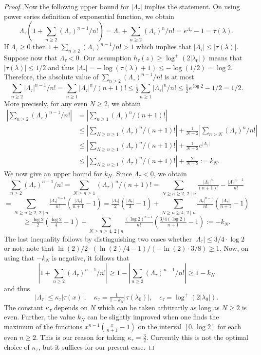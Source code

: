 \begin{proof}
Now the following upper bound for $|\Lambda_\tau|$ implies the statement. On using power series definition of exponential function, we obtain $$\Lambda_\tau(1+\sum_{n\geq 2} (\Lambda_\tau)^{n-1}/n!)=\Lambda_\tau+\sum_{n\geq 2} (\Lambda_\tau)^n/n!=e^{\Lambda_\tau}-1=\tau(\lambda).$$
If $\Lambda_\tau\geq 0$ then $1+\sum_{n\geq 2} (\Lambda_\tau)^{n-1}/n!>1$ which implies that $|\Lambda_\tau|\leq |\tau(\lambda)|.$ Suppose now that $\Lambda_\tau<0$. Our assumption $h_{\tau}(z)\geq \log^+ (2|\lambda_0|)$ means that $|\tau(\lambda)|\leq 1/2$ and thus $|\Lambda_\tau|=-\log (\tau(\lambda)+1)\leq -\log(1/2)=\log 2.$ Therefore, the absolute value of $\sum_{n\geq 2} (\Lambda_\tau)^{n-1}/n!$ is at most $$\sum_{n\geq 2} |\Lambda_\tau|^{n-1}/n!=\sum_{n\geq 1} |\Lambda_\tau|^{n}/(n+1)!\leq \tfrac{1}{2}\sum_{n\geq 1} |\Lambda_\tau|^{n}/n!\leq
\tfrac{1}{2}e^{\log 2}-1/2=1/2.$$
More precisely, for any even $N\geq 2$, we obtain 
\begin{align*}
|\sum_{n\geq 2} (\Lambda_\tau)^{n-1}/n!|
	& =|\sum_{n\geq 1} (\Lambda_\tau)^{n}/(n+1)!|\\
	&\leq |\sum_{N\geq n\geq 1} (\Lambda_\tau)^{n}/(n+1)!|+\tfrac{1}{N+2}|\sum_{n>N} (\Lambda_\tau)^{n}/n!|\\
	&\leq |\sum_{N\geq n\geq 1} (\Lambda_\tau)^{n}/(n+1)!|+\tfrac{1}{N+2}e^{|\Lambda_\tau|}\\
	& \leq |\sum_{N\geq n\geq 1} (\Lambda_\tau)^{n}/(n+1)!|+\tfrac{2}{N+2}:=k_N.
\end{align*}
We now give an upper bound for $k_N$. Since $\Lambda_\tau<0$, we obtain
$$\sum_{n\geq 2} (\Lambda_\tau)^{n-1}/n!=\sum_{N\geq n\geq 1} (\Lambda_\tau)^{n}/(n+1)!=\sum_{N\geq n\geq 2, \, 2\mid n}\tfrac{|\Lambda_\tau|^n}{(n+1)!}-\tfrac{|\Lambda_\tau|^{n-1}}{n!}$$
$$=\sum_{N\geq n\geq 2, \, 2\mid n}\tfrac{|\Lambda_\tau|^{n-1}}{n!}(\tfrac{|\Lambda_\tau|}{n+1}-1)=\tfrac{|\Lambda_\tau|}{2}(\tfrac{|\Lambda_\tau|}{3}-1)+\sum_{N\geq n\geq 4, \, 2\mid n}\tfrac{|\Lambda_\tau|^{n-1}}{n!}(\tfrac{|\Lambda_\tau|}{n+1}-1)$$
$$\geq \tfrac{\log 2}{2}(\tfrac{\log 2}{4}-1)+\sum_{N\geq n\geq 4, \, 2\mid n}\tfrac{(\log 2)^{n-1}}{n!}(\tfrac{3/4(\log 2)}{n+1}-1):=-k_N.$$
The last inequality follows by distinguishing two cases whether  $|\Lambda_\tau|\leq 3/4\cdot \log 2$ or not; note that $\ln(2)/2\cdot(\ln(2)/4-1)/(-\ln (2)\cdot3/8)\geq 1$.  Now, on using that $-k_N$ is negative, it follows that 
\[|1+\sum_{n\geq 2} (\Lambda_\tau)^{n-1}/n!|\geq 1-|\sum_{n\geq 2} (\Lambda_\tau)^{n-1}/n!|\geq 1-k_N\]
and thus 
$$|\Lambda_\tau|\leq \kappa_\tau|\tau(x)|, \quad \kappa_\tau=\tfrac{1}{1-k_N}|\tau(\lambda_0)|,  \quad c_\tau=\log^+(2|\lambda_0|).$$
The constant $\kappa_\tau$ depends on $N$ which can be taken arbitrarily as long as $N\geq 2$ is even. Further, the value $k_N$ can be slightly improved when one finds the maximum of the functions $x^{n-1}(\tfrac{x}{n+1}-1)$ on the interval $[0,\log 2]$ for each even $n\geq 2$. This is our reason for taking $\kappa_{\tau} = \frac{3}{2}$. Currently this is not the optimal choice of $\kappa_{\tau}$, but it suffices for our present case. 


\end{proof}
